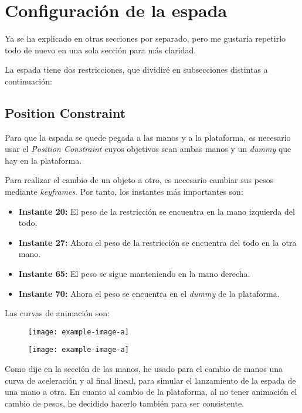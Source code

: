 \section{Configuración de la espada}

Ya se ha explicado en otras secciones por separado, pero me gustaría repetirlo todo de nuevo en una sola sección para más claridad.

\bigskip

La espada tiene dos restricciones, que dividiré en subsecciones distintas a continuación:

\subsection{Position Constraint}

Para que la espada se quede pegada a las manos y a la plataforma, es necesario usar el \textit{Position Constraint} cuyos objetivos sean ambas manos y un \textit{dummy} que hay en la plataforma.

\bigskip

Para realizar el cambio de un objeto a otro, es necesario cambiar sus pesos mediante \textit{keyframes}. Por tanto, los instantes más importantes son: 

\begin{itemize}
    \item \textbf{Instante 20: }El peso de la restricción se encuentra en la mano izquierda del todo.
    \item \textbf{Instante 27: }Ahora el peso de la restricción se encuentra del todo en la otra mano.
    \item \textbf{Instante 65: }El peso se sigue manteniendo en la mano derecha.
    \item \textbf{Instante 70: }Ahora el peso se encuentra en el \textit{dummy} de la plataforma.
\end{itemize}

\bigskip

Las curvas de animación son:

\begin{figure}[H]
    \centering
   \texttt{[image: example-image-a]}
\end{figure}

\begin{figure}[H]
    \centering
   \texttt{[image: example-image-a]}
\end{figure}

Como dije en la sección de las manos, he usado para el cambio de manos una curva de aceleración y al final lineal, para simular el lanzamiento de la espada de una mano a otra. En cuanto al cambio de la plataforma, al no tener animación el cambio de pesos, he decidido hacerlo también para ser consistente.


